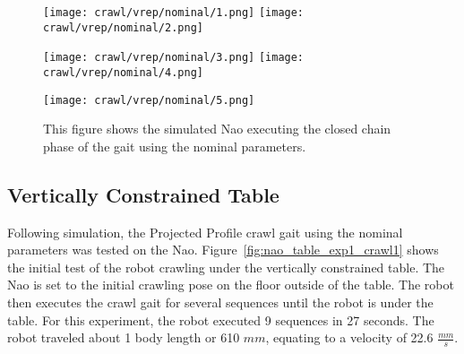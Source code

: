 \begin{figure}
  \centerline{
    \texttt{[image: crawl/vrep/nominal/1.png]}
    \texttt{[image: crawl/vrep/nominal/2.png]}
  }
  \centerline{
    \texttt{[image: crawl/vrep/nominal/3.png]}
    \texttt{[image: crawl/vrep/nominal/4.png]}
  }
  \centerline{
    \texttt{[image: crawl/vrep/nominal/5.png]}
  }
  \caption{This figure shows the simulated Nao executing the closed chain phase
           of the gait using the nominal parameters.}
  \label{fig:vrep_nao_nom_gait1}
\end{figure}

\subsection{Vertically Constrained Table}


Following simulation, the Projected Profile crawl gait using the nominal parameters
was tested on the Nao. Figure~\ref{fig:nao_table_exp1_crawl1} shows the initial test of the
robot crawling under the vertically constrained table. The Nao is set to the initial
crawling pose on the floor outside of the table. The robot then executes the crawl
gait for several sequences until the robot is under the table.
For this experiment, the robot executed 9 sequences in 27 seconds. The robot traveled
about 1 body length or 610 $mm$, equating to a velocity of 22.6 $\frac{mm}{s}$.


